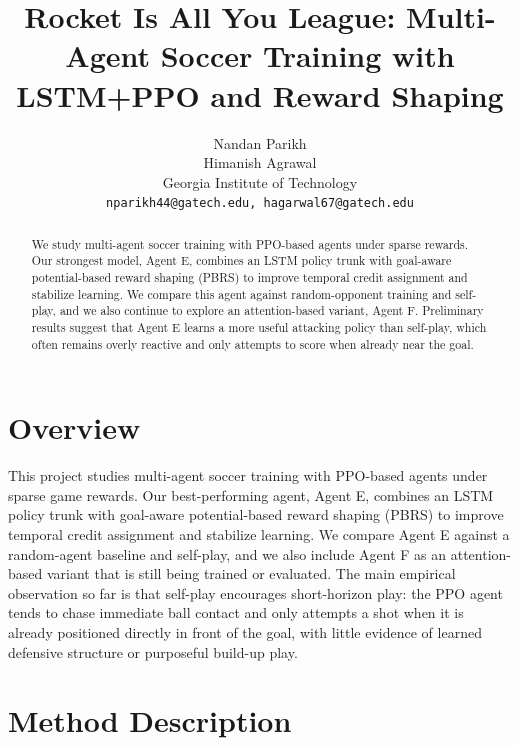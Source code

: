 \documentclass{article}
\title{Rocket Is All You League: Multi-Agent Soccer Training with LSTM+PPO and Reward Shaping}
\author{
  Nandan Parikh \\
  Himanish Agrawal \\
  Georgia Institute of Technology \\
  \texttt{nparikh44@gatech.edu, hagarwal67@gatech.edu} \\
}
\begin{document}
\maketitle


\begin{abstract}
    We study multi-agent soccer training with PPO-based agents under sparse rewards. Our strongest model, Agent E, combines an LSTM policy trunk with goal-aware potential-based reward shaping (PBRS) to improve temporal credit assignment and stabilize learning. We compare this agent against random-opponent training and self-play, and we also continue to explore an attention-based variant, Agent F. Preliminary results suggest that Agent E learns a more useful attacking policy than self-play, which often remains overly reactive and only attempts to score when already near the goal.
\end{abstract}



\section{Overview}
This project studies multi-agent soccer training with PPO-based agents under sparse game rewards. Our best-performing agent, Agent E, combines an LSTM policy trunk with goal-aware potential-based reward shaping (PBRS) to improve temporal credit assignment and stabilize learning. We compare Agent E against a random-agent baseline and self-play, and we also include Agent F as an attention-based variant that is still being trained or evaluated. The main empirical observation so far is that self-play encourages short-horizon play: the PPO agent tends to chase immediate ball contact and only attempts a shot when it is already positioned directly in front of the goal, with little evidence of learned defensive structure or purposeful build-up play.


\section{Method Description}
\label{sec:method}
\end{document}
